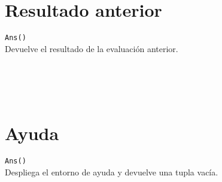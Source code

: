    \section{Resultado anterior}
      \texttt{Ans()}
      \\
      
      Devuelve el resultado de la evaluación anterior.
      
      \begin{fxcode}
         \\
         \\
         \\
      \end{fxcode}
      
   \section{Ayuda}
      \texttt{Ans()}
      \\
      
      Despliega el entorno de ayuda y devuelve una tupla vacía.
      
      \begin{fxcode}
         \\
         \outcode{} 
      \end{fxcode}
      
   
   
   
   
   
   
   
   
   
   